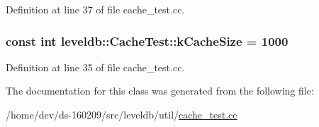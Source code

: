 Definition at line 37 of file cache\+\_\+test.\+cc.

\hypertarget{classleveldb_1_1_cache_test_a101eeca736aed0fde7048d0bf21b7e0a}{}
\subsubsection[{k\+Cache\+Size}]{\setlength{\rightskip}{0pt plus 5cm}const int leveldb\+::\+Cache\+Test\+::k\+Cache\+Size = 1000\hspace{0.3cm}{\ttfamily [static]}}\label{classleveldb_1_1_cache_test_a101eeca736aed0fde7048d0bf21b7e0a}


Definition at line 35 of file cache\+\_\+test.\+cc.



The documentation for this class was generated from the following file\+:\begin{DoxyCompactItemize}
\item 
/home/dev/ds-\/160209/src/leveldb/util/\hyperlink{cache__test_8cc}{cache\+\_\+test.\+cc}\end{DoxyCompactItemize}
